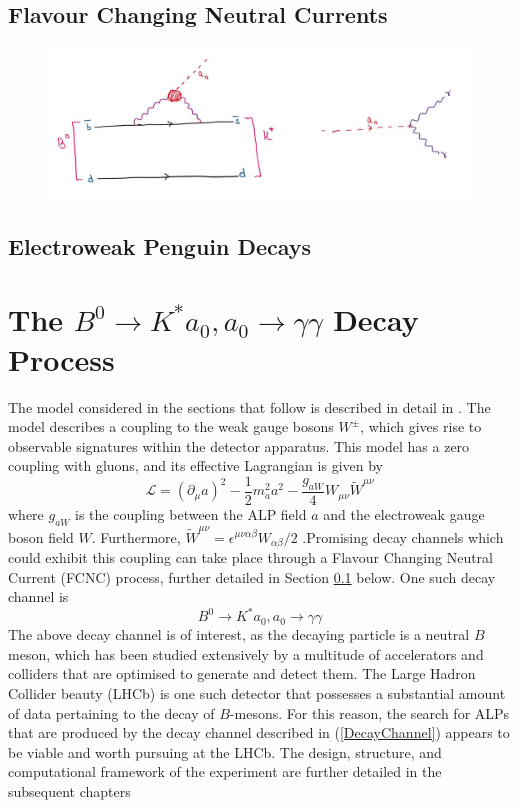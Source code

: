 \subsection{Flavour Changing Neutral Currents}\label{FCNC}
\begin{figure}[H]
    \centering
    \includegraphics[scale=0.55]{FCNCALP.jpg}
\end{figure}
\subsection{Electroweak Penguin Decays}
\section{The $B^{0}\rightarrow K^{*}a_{0}, a_{0}\rightarrow\gamma\gamma$ Decay Process} 
The model considered in the sections that follow is described in detail in \cite{Izaguirre2016ANF}. The model describes a
coupling to the weak gauge bosons $W^{\pm}$, which gives rise to observable signatures within the detector apparatus. This model has a
zero coupling with gluons, and its effective Lagrangian is given by
\begin{equation}
    \mathcal{L} = (\partial_{\mu}a)^{2}-\frac{1}{2}m_{a}^{2}a^{2}-\frac{g_{aW}}{4}W_{\mu\nu}\tilde{W}^{\mu\nu}
\end{equation}
where $g_{aW}$ is the coupling between the ALP field $a$ and the electroweak gauge boson field $W$. Furthermore, $\tilde{W}^{\mu\nu} = \epsilon^{\mu\nu\alpha\beta}W_{\alpha\beta}/2$ \cite{Izaguirre2016ANF}.Promising decay channels which could exhibit this coupling can take
place through a Flavour Changing Neutral Current (FCNC) process, further detailed in Section \ref{FCNC} below. One such decay channel is 
\begin{equation}\label{DecayChannel}
    B^{0}\rightarrow K^{*}a_{0}, a_{0}\rightarrow\gamma\gamma
\end{equation}
The above decay channel is of interest, as the decaying particle is a neutral $B$ meson, which has been studied extensively by a multitude of accelerators and colliders that are optimised to generate and detect
them. The Large Hadron Collider beauty (LHCb) is one such detector that possesses a substantial amount of data pertaining to the decay of $B$-mesons. For this reason, the search for ALPs that are produced by the decay channel
described in (\ref{DecayChannel}) appears to be viable and worth pursuing at the LHCb. The design, structure, and computational framework of the experiment are further detailed in the subsequent chapters




